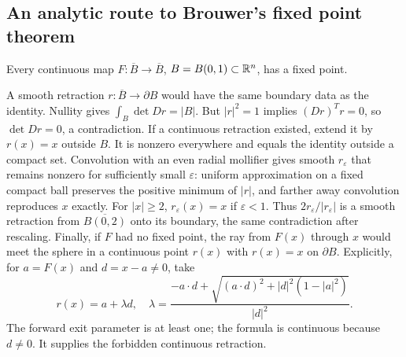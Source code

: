 \Needspace{45mm}
\subsection{An analytic route to Brouwer's fixed point theorem}
\Needspace{55mm}
\begin{theorem}
Every continuous map $F:\overline B\to\overline B$, $B=B(0,1)\subset\mathbb{R}^n$,
has a fixed point.
\end{theorem}
\begin{expandedproof}
A smooth retraction $r:\overline B\to\partial B$ would have the same
boundary data as the identity. Nullity gives $\int_B\det Dr=|B|$.
But $|r|^2=1$ implies $(Dr)^Tr=0$, so $\det Dr=0$, a contradiction.
If a continuous retraction existed, extend it by $r(x)=x$ outside $B$.
It is nonzero everywhere and equals the identity outside a compact set.
Convolution with an even radial mollifier gives smooth $r_\varepsilon$
that remains nonzero for sufficiently small $\varepsilon$: uniform
approximation on a fixed compact ball preserves the positive minimum
of $|r|$, and farther away convolution reproduces $x$ exactly.
For $|x|\geq2$, $r_\varepsilon(x)=x$ if $\varepsilon<1$.
Thus $2r_\varepsilon/|r_\varepsilon|$ is a smooth retraction from
$\overline{B(0,2)}$ onto its boundary, the same contradiction after rescaling.
Finally, if $F$ had no fixed point, the ray from $F(x)$ through $x$ would
meet the sphere in a continuous point $r(x)$ with $r(x)=x$ on $\partial B$.
Explicitly, for $a=F(x)$ and $d=x-a\ne0$, take
\[
 r(x)=a+\lambda d,\quad
 \lambda=\frac{-a\cdot d+\sqrt{(a\cdot d)^2+|d|^2(1-|a|^2)}}{|d|^2}.
\]
The forward exit parameter is at least one; the formula is continuous
because $d\ne0$. It supplies the forbidden continuous retraction.
\end{expandedproof}
